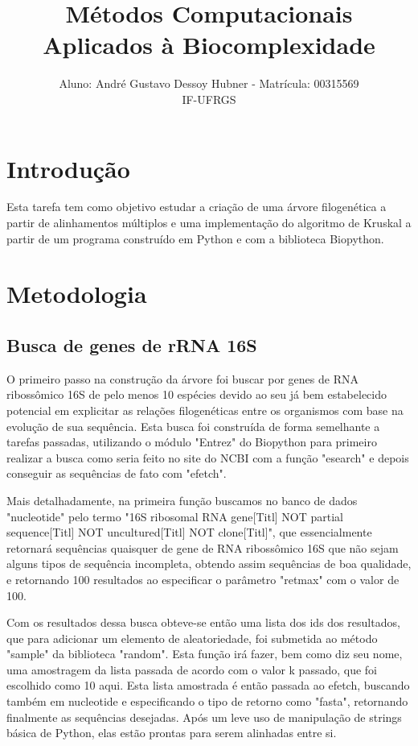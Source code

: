 \documentclass[brazilian,12pt,a4paper,final]{article}
\title{Métodos Computacionais Aplicados à Biocomplexidade}
\author{Aluno: André Gustavo Dessoy Hubner - Matrícula: 00315569 \\ IF-UFRGS}
\begin{document}
	\maketitle
	
	\section{Introdu\c{c}\~ao} 
	\indent 
	Esta tarefa tem como objetivo estudar a criação de uma árvore filogenética a partir de alinhamentos múltiplos e uma implementação do algoritmo de Kruskal a partir de um programa construído em Python e com a biblioteca Biopython.
	
	\section{Metodologia}
	\subsection{Busca de genes de rRNA 16S}
	O primeiro passo na construção da árvore foi buscar por genes de RNA ribossômico 16S de pelo menos 10 espécies devido ao seu já bem estabelecido potencial em explicitar as relações filogenéticas entre os organismos com base na evolução de sua sequência. Esta busca foi construída de forma semelhante a tarefas passadas, utilizando o módulo "Entrez" do Biopython para primeiro realizar a busca como seria feito no site do NCBI com a função "esearch" e depois conseguir as sequências de fato com "efetch".
	\vspace{0.5cm}
	
	Mais detalhadamente, na primeira função buscamos no banco de dados "nucleotide" pelo termo "16S ribosomal RNA gene[Titl] NOT partial sequence[Titl] NOT uncultured[Titl] NOT clone[Titl]", que essencialmente retornará sequências quaisquer de gene de RNA ribossômico 16S que não sejam alguns tipos de sequência incompleta, obtendo assim sequências de boa qualidade, e retornando 100 resultados ao especificar o parâmetro "retmax" com o valor de 100.
	\vspace{0.5cm}
	
	Com os resultados dessa busca obteve-se então uma lista dos ids dos resultados, que para adicionar um elemento de aleatoriedade, foi submetida ao método "sample" da biblioteca "random". Esta função irá fazer, bem como diz seu nome, uma amostragem da lista passada de acordo com o valor k passado, que foi escolhido como 10 aqui. Esta lista amostrada é então passada ao efetch, buscando também em nucleotide e especificando o tipo de retorno como "fasta", retornando finalmente as sequências desejadas. Após um leve uso de manipulação de strings básica de Python, elas estão prontas para serem alinhadas entre si.
	\vspace{0.5cm}
	
\end{document}
